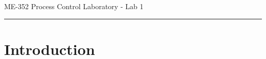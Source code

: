 ﻿\documentclass[12pt]{article}
\begin{document}
\begin{center}
{\LARGE ME-352 Process Control Laboratory - Lab 1\par}
\end{center}
\hrule
\vspace{1.5em}

\section*{Introduction}
\end{document}
